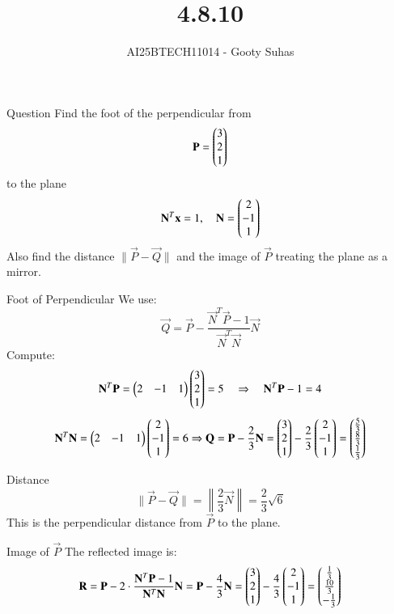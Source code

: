 \documentclass{beamer}
\title{4.8.10}
\author{AI25BTECH11014 - Gooty Suhas}
\begin{document}
\frame{\titlepage}

\begin{frame}{Question}
Find the foot of the perpendicular from
\[
\mathbf{P} = \begin{pmatrix}3 \\ 2 \\ 1\end{pmatrix}
\]
to the plane
\[
\mathbf{N}^T \mathbf{x} = 1,\quad \mathbf{N} = \begin{pmatrix}2 \\ -1 \\ 1\end{pmatrix}
\]
Also find the distance \( \|\vec{P} - \vec{Q}\| \) and the image of \( \vec{P} \) treating the plane as a mirror.
\end{frame}

\begin{frame}{Foot of Perpendicular}
We use:
\[
\vec{Q} = \vec{P} - \frac{\vec{N}^T \vec{P} - 1}{\vec{N}^T \vec{N}} \vec{N}
\]
Compute:
\[
\mathbf{N}^T \mathbf{P} = \begin{pmatrix}2 & -1 & 1\end{pmatrix} \begin{pmatrix}3 \\ 2 \\ 1\end{pmatrix} = 5
\quad \Rightarrow \quad \mathbf{N}^T \mathbf{P} - 1 = 4
\]
\[
\mathbf{N}^T \mathbf{N} = \begin{pmatrix}2 & -1 & 1\end{pmatrix} \begin{pmatrix}2 \\ -1 \\ 1\end{pmatrix} = 6
\Rightarrow \mathbf{Q} = \mathbf{P} - \frac{2}{3} \mathbf{N}
= \begin{pmatrix}3 \\ 2 \\ 1\end{pmatrix} - \frac{2}{3} \begin{pmatrix}2 \\ -1 \\ 1\end{pmatrix}
= \begin{pmatrix}\frac{5}{3} \\ \frac{8}{3} \\ \frac{1}{3}\end{pmatrix}
\]
\end{frame}

\begin{frame}{Distance}
\[
\|\vec{P} - \vec{Q}\| = \left\| \frac{2}{3} \vec{N} \right\|
= \frac{2}{3} \sqrt{6}
\]
This is the perpendicular distance from \( \vec{P} \) to the plane.
\end{frame}

\begin{frame}{Image of \( \vec{P} \)}
The reflected image is:
\[
\mathbf{R} = \mathbf{P} - 2 \cdot \frac{\mathbf{N}^T \mathbf{P} - 1}{\mathbf{N}^T \mathbf{N}} \mathbf{N}
= \mathbf{P} - \frac{4}{3} \mathbf{N}
= \begin{pmatrix}3 \\ 2 \\ 1\end{pmatrix} - \frac{4}{3} \begin{pmatrix}2 \\ -1 \\ 1\end{pmatrix}
= \begin{pmatrix}\frac{1}{3} \\ \frac{10}{3} \\ -\frac{1}{3}\end{pmatrix}
\]
\end{frame}
\end{document}
